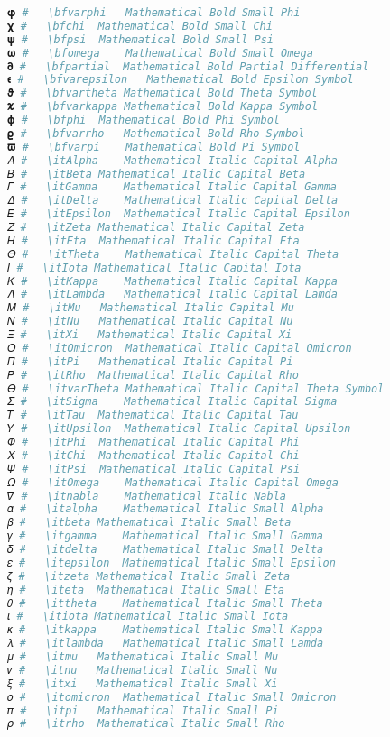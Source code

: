 \begin{lstlisting}[language=Julia, style=julia]
𝛗 #   \bfvarphi   Mathematical Bold Small Phi
𝛘 #   \bfchi  Mathematical Bold Small Chi
𝛙 #   \bfpsi  Mathematical Bold Small Psi
𝛚 #   \bfomega    Mathematical Bold Small Omega
𝛛 #   \bfpartial  Mathematical Bold Partial Differential
𝛜 #   \bfvarepsilon   Mathematical Bold Epsilon Symbol
𝛝 #   \bfvartheta Mathematical Bold Theta Symbol
𝛞 #   \bfvarkappa Mathematical Bold Kappa Symbol
𝛟 #   \bfphi  Mathematical Bold Phi Symbol
𝛠 #   \bfvarrho   Mathematical Bold Rho Symbol
𝛡 #   \bfvarpi    Mathematical Bold Pi Symbol
𝛢 #   \itAlpha    Mathematical Italic Capital Alpha
𝛣 #   \itBeta Mathematical Italic Capital Beta
𝛤 #   \itGamma    Mathematical Italic Capital Gamma
𝛥 #   \itDelta    Mathematical Italic Capital Delta
𝛦 #   \itEpsilon  Mathematical Italic Capital Epsilon
𝛧 #   \itZeta Mathematical Italic Capital Zeta
𝛨 #   \itEta  Mathematical Italic Capital Eta
𝛩 #   \itTheta    Mathematical Italic Capital Theta
𝛪 #   \itIota Mathematical Italic Capital Iota
𝛫 #   \itKappa    Mathematical Italic Capital Kappa
𝛬 #   \itLambda   Mathematical Italic Capital Lamda
𝛭 #   \itMu   Mathematical Italic Capital Mu
𝛮 #   \itNu   Mathematical Italic Capital Nu
𝛯 #   \itXi   Mathematical Italic Capital Xi
𝛰 #   \itOmicron  Mathematical Italic Capital Omicron
𝛱 #   \itPi   Mathematical Italic Capital Pi
𝛲 #   \itRho  Mathematical Italic Capital Rho
𝛳 #   \itvarTheta Mathematical Italic Capital Theta Symbol
𝛴 #   \itSigma    Mathematical Italic Capital Sigma
𝛵 #   \itTau  Mathematical Italic Capital Tau
𝛶 #   \itUpsilon  Mathematical Italic Capital Upsilon
𝛷 #   \itPhi  Mathematical Italic Capital Phi
𝛸 #   \itChi  Mathematical Italic Capital Chi
𝛹 #   \itPsi  Mathematical Italic Capital Psi
𝛺 #   \itOmega    Mathematical Italic Capital Omega
𝛻 #   \itnabla    Mathematical Italic Nabla
𝛼 #   \italpha    Mathematical Italic Small Alpha
𝛽 #   \itbeta Mathematical Italic Small Beta
𝛾 #   \itgamma    Mathematical Italic Small Gamma
𝛿 #   \itdelta    Mathematical Italic Small Delta
𝜀 #   \itepsilon  Mathematical Italic Small Epsilon
𝜁 #   \itzeta Mathematical Italic Small Zeta
𝜂 #   \iteta  Mathematical Italic Small Eta
𝜃 #   \ittheta    Mathematical Italic Small Theta
𝜄 #   \itiota Mathematical Italic Small Iota
𝜅 #   \itkappa    Mathematical Italic Small Kappa
𝜆 #   \itlambda   Mathematical Italic Small Lamda
𝜇 #   \itmu   Mathematical Italic Small Mu
𝜈 #   \itnu   Mathematical Italic Small Nu
𝜉 #   \itxi   Mathematical Italic Small Xi
𝜊 #   \itomicron  Mathematical Italic Small Omicron
𝜋 #   \itpi   Mathematical Italic Small Pi
𝜌 #   \itrho  Mathematical Italic Small Rho

\end{lstlisting}
